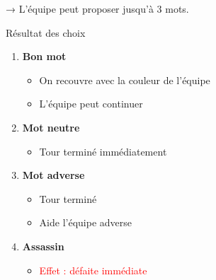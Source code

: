 \documentclass[12pt,a4paper]{article}
\begin{document}
\begin{enumerate}
\begin{enumerate}
                            → L’équipe peut proposer jusqu’à 3 mots.

                            \vspace{0.5cm}

                            Résultat des choix

                            \begin{enumerate}

                                \item \textbf{Bon mot}

                                    \begin{itemize}
                                        \item On recouvre avec la couleur de l’équipe
                                        \item L’équipe peut continuer
                                    \end{itemize}

                                \item \textbf{Mot neutre}

                                    \begin{itemize}
                                        \item Tour terminé immédiatement
                                    \end{itemize}

                                \item \textbf{Mot adverse}

                                    \begin{itemize}
                                        \item Tour terminé
                                        \item Aide l’équipe adverse
                                    \end{itemize}

                                \item \textbf{Assassin}

                                    \begin{itemize}
                                        \item \textcolor{red}{Effet : défaite immédiate}
                                    \end{itemize}

                            \end{enumerate}


\end{enumerate}
\end{enumerate}
\end{document}
